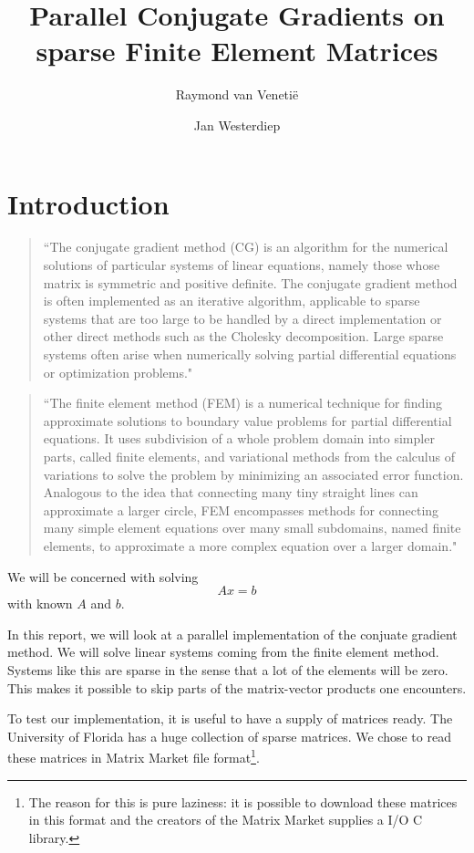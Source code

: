\documentclass[11pt]{amsart}
\theoremstyle{definition}
\begin{document}
\title{Parallel Conjugate Gradients on sparse Finite Element Matrices}
\author{Raymond van Veneti\"e \and Jan Westerdiep}
\maketitle

\section{Introduction}
\begin{quote}
``The conjugate gradient method (CG) is an algorithm for the numerical solutions of particular systems of linear equations, namely those whose matrix is symmetric and positive definite. The conjugate gradient method is often implemented as an iterative algorithm, applicable to sparse systems that are too large to be handled by a direct implementation or other direct methods such as the Cholesky decomposition. Large sparse systems often arise when numerically solving partial differential equations or optimization problems." \cite{wiki:cg}
\end{quote}

\begin{quote}
``The finite element method (FEM) is a numerical technique for finding approximate solutions to boundary value problems for partial differential equations. It uses subdivision of a whole problem domain into simpler parts, called finite elements, and variational methods from the calculus of variations to solve the problem by minimizing an associated error function. Analogous to the idea that connecting many tiny straight lines can approximate a larger circle, FEM encompasses methods for connecting many simple element equations over many small subdomains, named finite elements, to approximate a more complex equation over a larger domain." \cite{wiki:fem}
\end{quote}

We will be concerned with solving
\[
  Ax = b
\]
with known $A$ and $b$.

In this report, we will look at a parallel implementation of the conjuate gradient method. We will solve linear systems coming from the finite element method. Systems like this are sparse in the sense that a lot of the elements will be zero. This makes it possible to skip parts of the matrix-vector products one encounters.

To test our implementation, it is useful to have a supply of matrices ready. The University of Florida has a huge collection of sparse matrices. \cite{uniflo} We chose to read these matrices in Matrix Market file format\footnote{The reason for this is pure laziness: it is possible to download these matrices in this format and the creators of the Matrix Market supplies a I/O C library.}. \cite{matmar}
\end{document}
